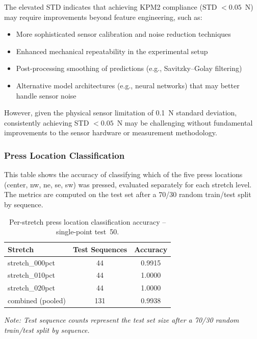 \documentclass[11pt,a4paper]{article}
\begin{document}
The elevated STD indicates that achieving KPM2 compliance (STD $< 0.05$~N) may require improvements beyond feature engineering, such as:
\begin{itemize}[leftmargin=1.5em]
    \item More sophisticated sensor calibration and noise reduction techniques
    \item Enhanced mechanical repeatability in the experimental setup
    \item Post-processing smoothing of predictions (e.g., Savitzky--Golay filtering)
    \item Alternative model architectures (e.g., neural networks) that may better handle sensor noise
\end{itemize}

However, given the physical sensor limitation of 0.1~N standard deviation, consistently achieving STD $< 0.05$~N may be challenging without fundamental improvements to the sensor hardware or measurement methodology.

\subsubsection{Press Location Classification}
This table shows the accuracy of classifying which of the five press locations (center, nw, ne, se, sw)
was pressed, evaluated separately for each stretch level. The metrics are computed on the test set after a 70/30 random train/test split by sequence.

\begin{table}[H]
    \centering
    \caption{Per-stretch press location classification accuracy – single-point test~50.}
    \label{tab:offset-single}
    \begin{tabular}{@{}lcc@{}}
        \toprule
        Stretch & Test Sequences & Accuracy \\
        \midrule
        stretch\_000pct & 44 & 0.9915 \\
        stretch\_010pct & 44 & 1.0000 \\
        stretch\_020pct & 44 & 1.0000 \\
        combined (pooled) & 131 & 0.9938 \\
        \bottomrule
    \end{tabular}
    \vspace{0.1cm}
    \footnotesize
    \textit{Note: Test sequence counts represent the test set size after a 70/30 random train/test split by sequence.}
\end{table}
\end{document}
